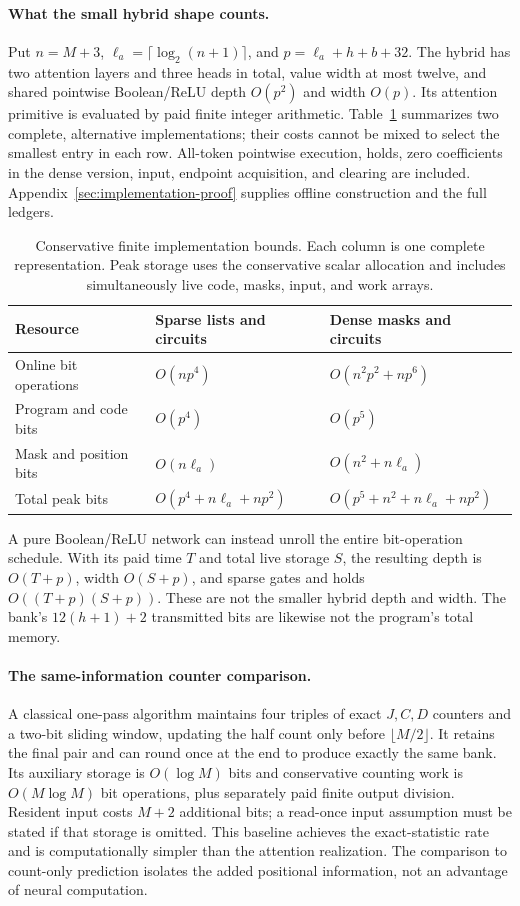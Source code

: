 \paragraph{What the small hybrid shape counts.}
Put $n=M+3$, $\ell_a=\lceil\log_2(n+1)\rceil$, and $p=\ell_a+h+b+32$. The hybrid has two attention layers and three heads in total, value width at most twelve, and shared pointwise Boolean/ReLU depth $O(p^2)$ and width $O(p)$. Its attention primitive is evaluated by paid finite integer arithmetic. Table~\ref{tab:costs} summarizes two complete, alternative implementations; their costs cannot be mixed to select the smallest entry in each row. All-token pointwise execution, holds, zero coefficients in the dense version, input, endpoint acquisition, and clearing are included. Appendix~\ref{sec:implementation-proof} supplies offline construction and the full ledgers.

\begin{table}[ht]
\centering
\small
\caption{Conservative finite implementation bounds. Each column is one complete representation. Peak storage uses the conservative scalar allocation and includes simultaneously live code, masks, input, and work arrays.}\label{tab:costs}
\begin{tabular}{@{}lll@{}}
\toprule
Resource & Sparse lists and circuits & Dense masks and circuits\\
\midrule
Online bit operations & $O(np^4)$ & $O(n^2p^2+np^6)$\\
Program and code bits & $O(p^4)$ & $O(p^5)$\\
Mask and position bits & $O(n\ell_a)$ & $O(n^2+n\ell_a)$\\
Total peak bits & $O(p^4+n\ell_a+np^2)$ & $O(p^5+n^2+n\ell_a+np^2)$\\
\bottomrule
\end{tabular}
\end{table}

A pure Boolean/ReLU network can instead unroll the entire bit-operation schedule. With its paid time $T$ and total live storage $S$, the resulting depth is $O(T+p)$, width $O(S+p)$, and sparse gates and holds $O((T+p)(S+p))$. These are not the smaller hybrid depth and width. The bank's $12(h+1)+2$ transmitted bits are likewise not the program's total memory.

\paragraph{The same-information counter comparison.}
A classical one-pass algorithm maintains four triples of exact $J,C,D$ counters and a two-bit sliding window, updating the half count only before $\lfloor M/2\rfloor$. It retains the final pair and can round once at the end to produce exactly the same bank. Its auxiliary storage is $O(\log M)$ bits and conservative counting work is $O(M\log M)$ bit operations, plus separately paid finite output division. Resident input costs $M+2$ additional bits; a read-once input assumption must be stated if that storage is omitted. This baseline achieves the exact-statistic rate and is computationally simpler than the attention realization. The comparison to count-only prediction isolates the added positional information, not an advantage of neural computation.

